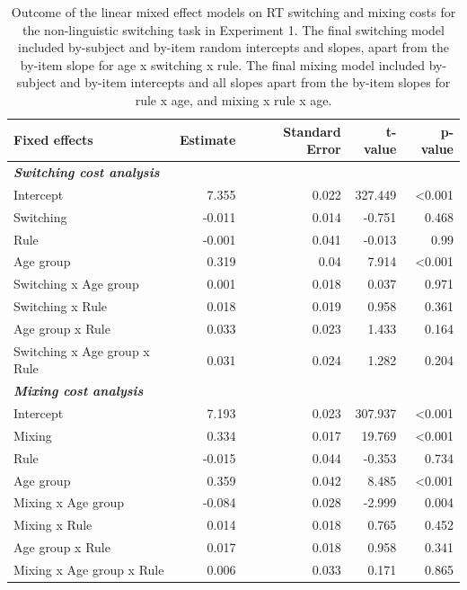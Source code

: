 \documentclass[
]{article}
\begin{document}
\newpage

\begin{table}[H]

\caption{\label{tab:TableS5}Outcome of the linear mixed effect models on RT switching and mixing costs for the non-linguistic switching task in Experiment 1. The final switching model included by-subject and by-item random intercepts and slopes, apart from the by-item slope for age x switching x rule. The final mixing model included by-subject and by-item intercepts and all slopes apart from the by-item slopes for rule x age, and mixing x rule x age.}
\centering
\begin{tabular}[t]{lrrrr}
\toprule
\textbf{Fixed effects} & \textbf{Estimate} & \textbf{Standard Error} & \textbf{t-value} & \textbf{p-value}\\
\midrule
\em{\textbf{Switching cost analysis}} & \em{\textbf{}} & \em{\textbf{}} & \em{\textbf{}} & \em{\textbf{}}\\
Intercept & 7.355 & 0.022 & 327.449 & <0.001\\
Switching & -0.011 & 0.014 & -0.751 & 0.468\\
Rule & -0.001 & 0.041 & -0.013 & 0.99\\
Age group & 0.319 & 0.04 & 7.914 & <0.001\\
\addlinespace
Switching x Age group & 0.001 & 0.018 & 0.037 & 0.971\\
Switching x Rule & 0.018 & 0.019 & 0.958 & 0.361\\
Age group x Rule & 0.033 & 0.023 & 1.433 & 0.164\\
Switching x Age group x Rule & 0.031 & 0.024 & 1.282 & 0.204\\
\em{\textbf{Mixing cost analysis}} & \em{\textbf{}} & \em{\textbf{}} & \em{\textbf{}} & \em{\textbf{}}\\
\addlinespace
Intercept & 7.193 & 0.023 & 307.937 & <0.001\\
Mixing & 0.334 & 0.017 & 19.769 & <0.001\\
Rule & -0.015 & 0.044 & -0.353 & 0.734\\
Age group & 0.359 & 0.042 & 8.485 & <0.001\\
Mixing x Age group & -0.084 & 0.028 & -2.999 & 0.004\\
\addlinespace
Mixing x Rule & 0.014 & 0.018 & 0.765 & 0.452\\
Age group x Rule & 0.017 & 0.018 & 0.958 & 0.341\\
Mixing x Age group x Rule & 0.006 & 0.033 & 0.171 & 0.865\\
\bottomrule
\end{tabular}
\end{table}
\end{document}
